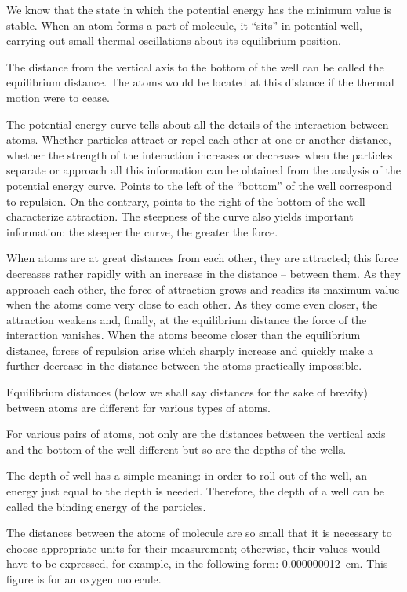 We know that the state in which the potential energy has the minimum value is stable. When an atom forms a part of molecule, it ``sits'' in potential well, carrying out small thermal oscillations about its equilibrium position.

The distance from the vertical axis to the bottom of the well can be called the equilibrium distance. The atoms would be located at this distance if the thermal motion were to cease.

The potential energy curve tells about all the details of the interaction between atoms. Whether particles attract or repel each other at one or another distance, whether the strength of the interaction increases or decreases when the particles separate or approach all this information can be obtained from the analysis of the potential energy curve. Points to the left of the ``bot­tom'' of the well correspond to repulsion. On the contrary, points to the right of the bottom of the well characterize attraction. The steepness of the curve also yields important information: the steeper the curve, the greater the force.

When atoms are at great distances from each other, they are attracted; this force decreases rather rapidly with an increase in the distance -- between them. As they approach each other, the force of attraction grows and readies its maximum value when the atoms come very close to each other. As they come even closer, the attraction weakens and, finally, at the equilibrium distance the force of the interaction vanishes. When the atoms become closer than the equilibrium distance, forces of repulsion arise which sharply increase and quickly make a further decrease in the distance between the atoms practically impossible.

Equilibrium distances (below we shall say distances for the sake of brevity) between atoms are different for various types of atoms.

For various pairs of atoms, not only are the distances between the vertical axis and the bottom of the well different but so are the depths of the wells.

The depth of well has a simple meaning: in order to roll out of the well, an energy just equal to the depth is needed. Therefore, the depth of a well can be called the binding energy of the particles.

The distances between the atoms of molecule are so small that it is necessary to choose appropriate units for their measurement; otherwise, their values would have to be expressed, for example, in the following form: \SI{0.000000012}{\centi\meter}. This figure is for an oxygen molecule.

